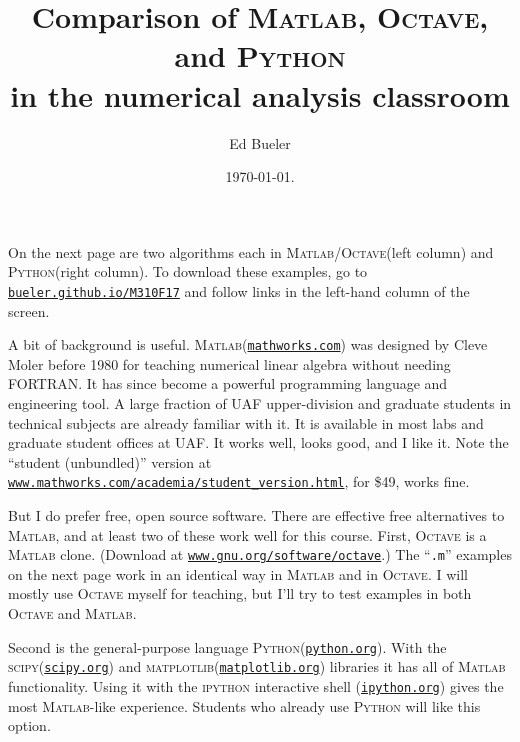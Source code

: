 \documentclass[11pt]{amsart}
\newcommand{\Matlab}{\textsc{Matlab}\xspace}
\newcommand{\Octave}{\textsc{Octave}\xspace}
\newcommand{\Python}{\textsc{Python}\xspace}
\newcommand{\scipy}{\textsc{scipy}\xspace}
\newcommand{\matplotlib}{\textsc{matplotlib}\xspace}
\begin{document}
\title{Comparison of \textsc{Matlab}, \textsc{Octave}, and \textsc{Python} \\ in the numerical analysis classroom}

\author{Ed Bueler}

\date{\today.}

\maketitle
\normalsize
\thispagestyle{empty}

\newcommand{\hrf}[2]{\href{#1}{\texttt{#2}}}

On the next page are two algorithms each in \Matlab/\Octave (left column) and \Python (right column).  To download these examples, go to \hrf{http://bueler.github.io/M615S17}{bueler.github.io/M310F17} and follow links in the left-hand column of the screen.

A bit of background is useful.  \Matlab (\hrf{http://www.mathworks.com/}{mathworks.com}) was designed by Cleve Moler before 1980 for teaching numerical linear algebra without needing FORTRAN.  It has since become a powerful programming language and engineering tool.  A large fraction of UAF upper-division and graduate students in technical subjects are already familiar with it.  It is available in most labs and graduate student offices at UAF.  It works well, looks good, and I like it.  Note the ``student (unbundled)'' version at \hrf{https://www.mathworks.com/academia/student_version.html}{www.mathworks.com/academia/student\_version.html}, for \$49, works fine.

But I do prefer free, open source software.  There are effective free alternatives to \Matlab, and at least two of these work well for this course.  First, \Octave is a \Matlab clone.  (Download at
\hrf{http://www.gnu.org/software/octave/}{www.gnu.org/software/octave}.)  The ``\texttt{.m}'' examples on the next page work in an identical way in \Matlab and in \Octave.  I will mostly use \Octave myself for teaching, but I'll try to test examples in both \Octave and \Matlab.

Second is the general-purpose language \Python (\hrf{http://python.org/}{python.org}).  With the \scipy (\hrf{http://www.scipy.org/}{scipy.org}) and \matplotlib (\hrf{http://matplotlib.org/}{matplotlib.org}) libraries it has all of \Matlab functionality.  Using it with the \textsc{ipython} interactive shell (\hrf{http://ipython.org/}{ipython.org}) gives the most \Matlab-like experience.  Students who already use \Python will like this option.
\end{document}

